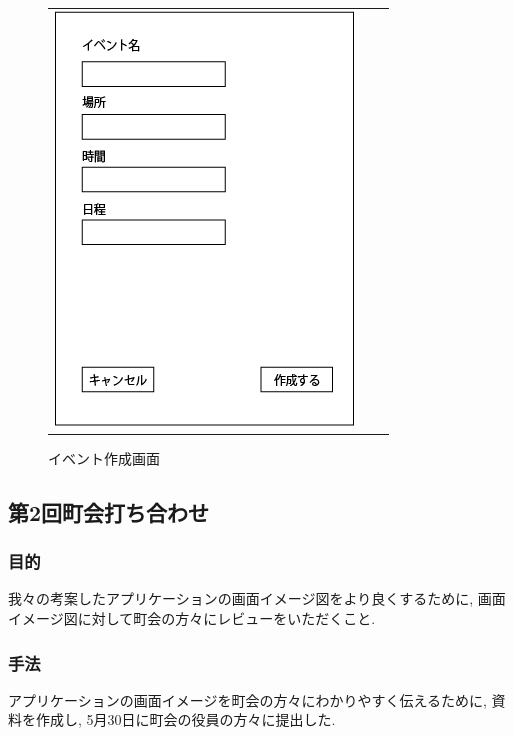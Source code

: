 \begin{figure}[h]
\begin{tabular}{ccc}
\begin{minipage}[t]{0.33\hsize}
        \caption{参加フォーム画面}
        \label{joinform}
      \end{minipage}
      \begin{minipage}[t]{0.33\hsize}
        \centering
        \includegraphics[keepaspectratio, scale=0.4]{process_figures/old_create_event.png}
        \caption{イベント作成画面}
        \label{create_event.old}
      \end{minipage}
    \end{tabular}
\end{figure}

\subsection{第2回町会打ち合わせ}
\subsubsection{目的}
\label{first_review}
我々の考案したアプリケーションの画面イメージ図をより良くするために, 画面イメージ図に対して町会の方々にレビューをいただくこと.
\subsubsection{手法}
\label{first_review_way}
アプリケーションの画面イメージを町会の方々にわかりやすく伝えるために, 資料を作成し, 5月30日に町会の役員の方々に提出した.

